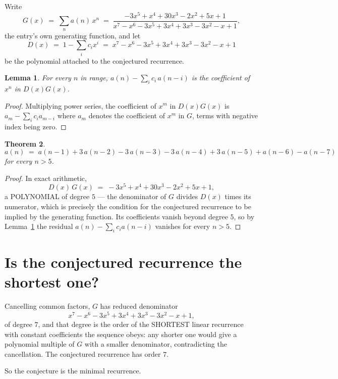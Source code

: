 \documentclass[11pt,a4paper]{article}
\theoremstyle{plain}
\newtheorem{theorem}{Theorem}
\newtheorem{lemma}[theorem]{Lemma}
\theoremstyle{definition}
\begin{document}
Write
\[
G(x)\;=\;\sum_{n}a(n)\,x^{n}\;=\;\frac{- 3 x^{5} + x^{4} + 30 x^{3} - 2 x^{2} + 5 x + 1}{x^{7} - x^{6} - 3 x^{5} + 3 x^{4} + 3 x^{3} - 3 x^{2} - x + 1},
\]
the entry's own generating function, and let
\[
D(x)\;=\;1-\sum_i c_i x^{i}\;=\;x^{7} - x^{6} - 3 x^{5} + 3 x^{4} + 3 x^{3} - 3 x^{2} - x + 1
\]
be the polynomial attached to the conjectured recurrence.

\begin{lemma}\label{lem:key}
For every $n$ in range, $a(n)-\sum_i c_i\,a(n-i)$ is the coefficient of $x^{n}$ in
$D(x)G(x)$.
\end{lemma}

\begin{proof}
Multiplying power series, the coefficient of $x^{m}$ in $D(x)G(x)$ is
$a_m-\sum_i c_i a_{m-i}$ where $a_m$ denotes the coefficient of $x^{m}$ in $G$, terms with
negative index being zero.
\end{proof}

\begin{theorem}
\[
a(n)\;=\;a(n-1) + 3\,a(n-2) - 3\,a(n-3) - 3\,a(n-4) + 3\,a(n-5) + a(n-6) - a(n-7)
\]
for every $n>5$.
\end{theorem}

\begin{proof}
In exact arithmetic,
\[
D(x)\,G(x)\;=\;- 3 x^{5} + x^{4} + 30 x^{3} - 2 x^{2} + 5 x + 1,
\]
a POLYNOMIAL of degree $5$ --- the denominator of $G$ divides $D(x)$ times its numerator,
which is precisely the condition for the conjectured recurrence to be implied by the
generating function. Its coefficients vanish beyond degree $5$, so by
Lemma~\ref{lem:key} the residual $a(n)-\sum_ic_ia(n-i)$ vanishes for every
$n>5$.
\end{proof}

\section{Is the conjectured recurrence the shortest one?}

Cancelling common factors, $G$ has reduced denominator
\[
x^{7} - x^{6} - 3 x^{5} + 3 x^{4} + 3 x^{3} - 3 x^{2} - x + 1,
\]
of degree $7$, and that degree is the order of the SHORTEST linear recurrence with
constant coefficients the sequence obeys: any shorter one would give a polynomial multiple of
$G$ with a smaller denominator, contradicting the cancellation. The conjectured recurrence has
order $7$.

So the conjecture is the minimal recurrence.
\end{document}
